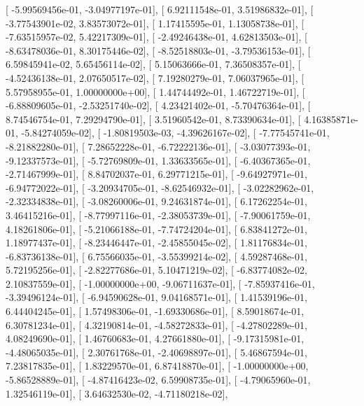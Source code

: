 \documentclass{article}
\begin{document}
       [ -5.99569456e-01,  -3.04977197e-01],
       [  6.92111548e-01,   3.51986832e-01],
       [ -3.77543901e-02,   3.83573072e-01],
       [  1.17415595e-01,   1.13058738e-01],
       [ -7.63515957e-02,   5.42217309e-01],
       [ -2.49246438e-01,   4.62813503e-01],
       [ -8.63478036e-01,   8.30175446e-02],
       [ -8.52518803e-01,  -3.79536153e-01],
       [  6.59845941e-02,   5.65456114e-02],
       [  5.15063666e-01,   7.36508357e-01],
       [ -4.52436138e-01,   2.07650517e-02],
       [  7.19280279e-01,   7.06037965e-01],
       [  5.57958955e-01,   1.00000000e+00],
       [  1.44744492e-01,   1.46722719e-01],
       [ -6.88809605e-01,  -2.53251740e-02],
       [  4.23421402e-01,  -5.70476364e-01],
       [  8.74546754e-01,   7.29294790e-01],
       [  3.51960542e-01,   8.73390634e-01],
       [  4.16385871e-01,  -5.84274059e-02],
       [ -1.80819503e-03,  -4.39626167e-02],
       [ -7.77545741e-01,  -8.21882280e-01],
       [  7.28652228e-01,  -6.72222136e-01],
       [ -3.03077393e-01,  -9.12337573e-01],
       [ -5.72769809e-01,   1.33633565e-01],
       [ -6.40367365e-01,  -2.71467999e-01],
       [  8.84702037e-01,   6.29771215e-01],
       [ -9.64927971e-01,  -6.94772022e-01],
       [ -3.20934705e-01,  -8.62546932e-01],
       [ -3.02282962e-01,  -2.32334838e-01],
       [ -3.08260006e-01,   9.24631874e-01],
       [  6.17262254e-01,   3.46415216e-01],
       [ -8.77997116e-01,  -2.38053739e-01],
       [ -7.90061759e-01,   4.18261806e-01],
       [ -5.21066188e-01,  -7.74724204e-01],
       [  6.83841272e-01,   1.18977437e-01],
       [ -8.23446447e-01,  -2.45855045e-02],
       [  1.81176834e-01,  -6.83736138e-01],
       [  6.75566035e-01,  -3.55399214e-02],
       [  4.59287468e-01,   5.72195256e-01],
       [ -2.82277686e-01,   5.10471219e-02],
       [ -6.83774082e-02,   2.10837559e-01],
       [ -1.00000000e+00,  -9.06711637e-01],
       [ -7.85937416e-01,  -3.39496124e-01],
       [ -6.94590628e-01,   9.04168571e-01],
       [  1.41539196e-01,   6.44404245e-01],
       [  1.57498306e-01,  -1.69330686e-01],
       [  8.59018674e-01,   6.30781234e-01],
       [  4.32190814e-01,  -4.58272833e-01],
       [ -4.27802289e-01,   4.08249690e-01],
       [  1.46760683e-01,   4.27661880e-01],
       [ -9.17315981e-01,  -4.48065035e-01],
       [  2.30761768e-01,  -2.40698897e-01],
       [  5.46867594e-01,   7.23817835e-01],
       [  1.83229570e-01,   6.87418870e-01],
       [ -1.00000000e+00,  -5.86528889e-01],
       [ -4.87416423e-02,   6.59908735e-01],
       [ -4.79065960e-01,   1.32546119e-01],
       [  3.64632530e-02,  -4.71180218e-02],
\end{document}
